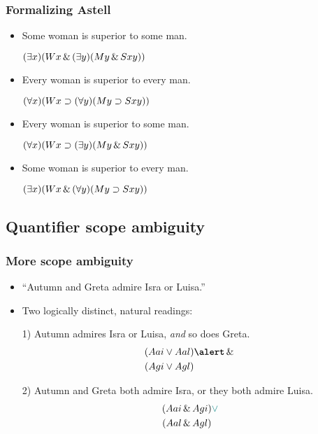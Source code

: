 \begin{frame}
    \frametitle{Formalizing Astell}

\begin{itemize}[<+->]
\item Some woman is superior to some man.
\item[] \alert{$(\exists x)(Wx \,\&\, (\exists y)(My \,\&\, Sxy))$}
\item Every woman is superior to every man.
\item[] \alert{$(\forall x)(Wx \supset (\forall y)(My \supset Sxy))$}
\item Every woman is superior to some man.
\item[]\alert{$(\forall x)(Wx \supset (\exists y)(My \,\&\, Sxy))$}
\item Some woman is superior to every man.
\item[] \alert{$(\exists x)(Wx \,\&\, (\forall y)(My \supset Sxy))$}
\end{itemize}
\end{frame}





\subsection{Quantifier scope ambiguity}

\begin{frame}
  \frametitle{More scope ambiguity}

\begin{itemize}[<+->]
\item ``Autumn and Greta admire Isra or Luisa.''
\item Two logically distinct, natural readings:
\item[1)] Autumn admires Isra or Luisa, \emph{and} so does Greta.
\begin{align*}
(A\qr{a}{i} \lor {} & A\qr{a}{l}) \emph{\land} {}\\
(A\qr{g}{i} \lor {} & A\qr{g}{l})
\end{align*}
\item[2)] Autumn and Greta both admire Isra, \textcolor{highlightB}{or} they both admire Luisa.
\begin{align*}
(A\qr{a}{i} \land {} & A\qr{g}{i}) \textcolor{highlightB}{\lor} {}\\
(A\qr{a}{l} \land {} & A\qr{g}{l})
\end{align*}
\end{itemize}

\end{frame}


